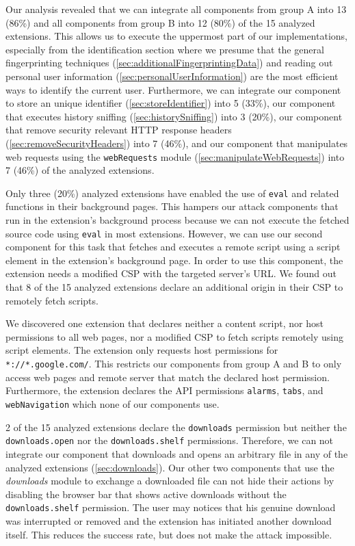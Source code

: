 	Our analysis revealed that we can integrate all components from group A into 13 (86\%) and all components from group B into 12 (80\%) of the 15 analyzed extensions. This allows us to execute the uppermost part of our implementations, especially from the identification section where we presume that the general fingerprinting techniques (\autoref{sec:additionalFingerprintingData}) and reading out personal user information (\autoref{sec:personalUserInformation}) are the most efficient ways to identify the current user. Furthermore, we can integrate our component to store an unique identifier (\autoref{sec:storeIdentifier}) into 5 (33\%), our component that executes history sniffing (\autoref{sec:historySniffing}) into 3 (20\%), our component that remove security relevant HTTP response headers (\autoref{sec:removeSecurityHeaders}) into 7 (46\%), and our component that manipulates web requests using the \texttt{webRequests} module (\autoref{sec:manipulateWebRequests}) into 7 (46\%) of the analyzed extensions.
	
	Only three (20\%) analyzed extensions have enabled the use of \texttt{eval} and related functions in their background pages. This hampers our attack components that run in the extension's background process because we can not execute the fetched source code using \texttt{eval} in most extensions. However, we can use our second component for this task that fetches and executes a remote script using a script element in the extension's background page. In order to use this component, the extension needs a modified CSP with the targeted server's URL. We found out that 8 of the 15 analyzed extensions declare an additional origin in their CSP to remotely fetch scripts. 
	
	We discovered one extension that declares neither a content script, nor host permissions to all web pages, nor a modified CSP to fetch scripts remotely using script elements. The extension only requests host permissions for \texttt{*://*.google.com/}. This restricts our components from group A and B to only access web pages and remote server that match the declared host permission. Furthermore, the extension declares the API permissions \texttt{alarms}, \texttt{tabs}, and \texttt{webNavigation} which none of our components use. %

	2 of the 15 analyzed extensions declare the \texttt{downloads} permission but neither the \texttt{downloads.open} nor the \texttt{downloads.shelf} permissions. Therefore, we can not integrate our component that downloads and opens an arbitrary file in any of the analyzed extensions (\autoref{sec:downloads}). Our other two components that use the \textit{downloads} module to exchange a downloaded file can not hide their actions by disabling the browser bar that shows active downloads without the \texttt{downloads.shelf} permission. The user may notices that his genuine download was interrupted or removed and the extension has initiated another download itself. This reduces the success rate, but does not make the attack impossible.
	
